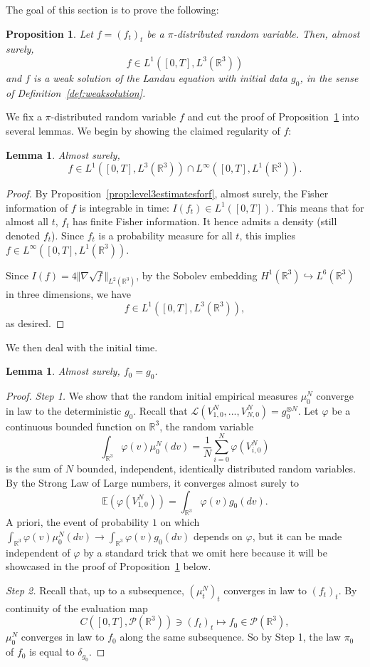 \documentclass[11pt,a4paper]{article}
\theoremstyle{definition}
\theoremstyle{plain}
\newtheorem{lemma}[defi]{Lemma}
\newtheorem{prop}[defi]{Proposition}
\begin{document}
The goal of this section is to prove the following:
\begin{prop}
\label{prop:aswsolution}
    Let $f=(f_t)_t$ be a $\pi$-distributed random variable. Then, almost surely,
    $$f\in L^1([0,T], L^3(\mathbb{R}^3))$$
    and $f$ is a weak solution of the Landau equation with initial data $g_0$, in the sense of Definition~\ref{def:weaksolution}.
\end{prop}
We fix a $\pi$-distributed random variable $f$ and cut the proof of Proposition~\ref{prop:aswsolution} into several lemmas. We begin by showing the claimed regularity of $f$:
\begin{lemma}
    \label{lem:aswsolution-regularity}
    Almost surely, 
    $$f\in L^1([0,T], L^3(\mathbb{R}^3)) \cap L^\infty([0,T], L^1(\mathbb{R}^3)).$$
\end{lemma}
\begin{proof}
    By Proposition~\ref{prop:level3estimatesforf}, almost surely, the Fisher information of $f$ is integrable in time: $I(f_t)\in L^1([0,T])$. This means that for almost all $t$, $f_t$ has finite Fisher information. It hence admits a density (still denoted $f_t$). Since $f_t$ is a probability measure for all $t$, this implies $f\in L^\infty([0,T], L^1(\mathbb{R}^3))$.

    Since $I(f)=4\Vert \nabla \sqrt{f} \Vert_{L^2(\mathbb{R}^3)}$, by the Sobolev embedding $ H^1(\mathbb{R}^3) \hookrightarrow L^6(\mathbb{R}^3)$ in three dimensions, we have
    $$f\in L^1([0,T], L^3(\mathbb{R}^3)),$$
    as desired.
\end{proof}

We then deal with the initial time.
\begin{lemma}
    \label{lem:aswsolution-initial time}
    Almost surely, $f_0=g_0$.
\end{lemma}
\begin{proof}
    \textit{Step 1.} We show that the random initial empirical measures $\mu^N_0$ converge in law to the deterministic $g_0$.
    Recall that $\mathcal{L}(V^N_{1,0},...,V^N_{N,0})=g_0^{\otimes N}$. Let $\varphi$ be a continuous bounded function on $\mathbb{R}^3$, the random variable
    $$\int_{\mathbb{R}^3} \varphi(v)\mu^N_0(dv)=\frac{1}{N}\sum_{i=0}^N \varphi(V^N_{i,0})$$
    is the sum of $N$ bounded, independent, identically distributed random variables. By the Strong Law of Large numbers, it converges almost surely to
    $$\mathbb{E}(\varphi(V^N_{1,0}))=\int_{\mathbb{R}^3} \varphi(v)g_0(dv).$$
    A priori, the event of probability $1$ on which  $\int_{\mathbb{R}^3} \varphi(v)\mu^N_0(dv) \rightarrow \int_{\mathbb{R}^3} \varphi(v)g_0(dv)$ depends on $\varphi$, but it can be made independent of $\varphi$ by a standard trick that we omit here because it will be showcased in the proof of Proposition~\ref{prop:aswsolution} below.

    \textit{Step 2.} Recall that, up to a subsequence, $(\mu^N_t)_t$ converges in law to $(f_t)_t$. By continuity of the evaluation map $$C([0,T],\mathcal{P}(\mathbb{R}^3))\ni (f_t)_t\mapsto f_0 \in\mathcal{P}(\mathbb{R}^3),$$
    $\mu^N_0$ converges in law to $f_0$ along the same subsequence. So by Step 1, the law $\pi_0$ of $f_0$ is equal to $\delta_{g_0}$.
\end{proof}
\end{document}
